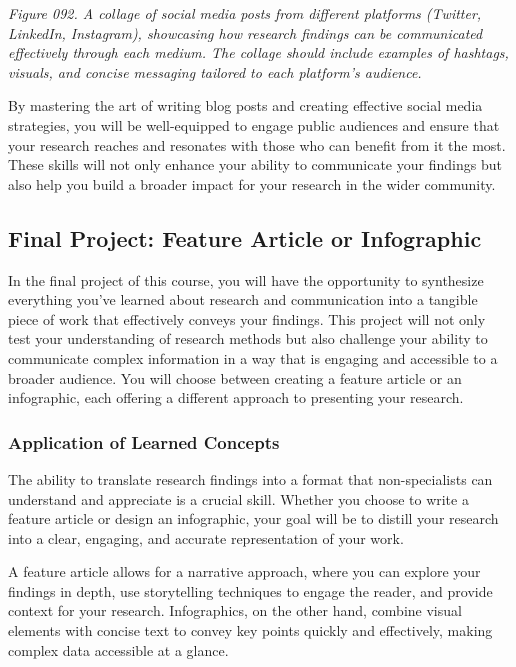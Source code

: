\documentclass[
]{book}
\begin{document}
\emph{Figure 092. A collage of social media posts from different platforms (Twitter, LinkedIn, Instagram), showcasing how research findings can be communicated effectively through each medium. The collage should include examples of hashtags, visuals, and concise messaging tailored to each platform's audience.}

By mastering the art of writing blog posts and creating effective social media strategies, you will be well-equipped to engage public audiences and ensure that your research reaches and resonates with those who can benefit from it the most. These skills will not only enhance your ability to communicate your findings but also help you build a broader impact for your research in the wider community.

\subsection{Final Project: Feature Article or Infographic}\label{final-project-feature-article-or-infographic}

In the final project of this course, you will have the opportunity to synthesize everything you've learned about research and communication into a tangible piece of work that effectively conveys your findings. This project will not only test your understanding of research methods but also challenge your ability to communicate complex information in a way that is engaging and accessible to a broader audience. You will choose between creating a feature article or an infographic, each offering a different approach to presenting your research.

\subsubsection{Application of Learned Concepts}\label{application-of-learned-concepts}

The ability to translate research findings into a format that non-specialists can understand and appreciate is a crucial skill. Whether you choose to write a feature article or design an infographic, your goal will be to distill your research into a clear, engaging, and accurate representation of your work.

A feature article allows for a narrative approach, where you can explore your findings in depth, use storytelling techniques to engage the reader, and provide context for your research. Infographics, on the other hand, combine visual elements with concise text to convey key points quickly and effectively, making complex data accessible at a glance.
\end{document}

